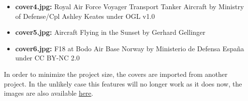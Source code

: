 \begin{itemize}
    \item \textbf{cover4.jpg:} Royal Air Force Voyager Transport Tanker Aircraft by Ministry of Defense/Cpl Ashley Keates under OGL v1.0
    \item \textbf{cover5.jpg:} Aircraft Flying in the Sunset by Gerhard Gellinger
    \item \textbf{cover6.jpg:} F18 at Bodo Air Base Norway by Ministerio de Defensa España under CC BY-NC 2.0
\end{itemize}

\noindent In order to minimize the project size, the covers are imported from another project. In the unlikely case this features will no longer work as it does now, the images are also available \underline{\href{https://github.com/dzwaneveld/TU-Delft-Unofficial-Report-Template/tree/master/layout/covers}{here}}.